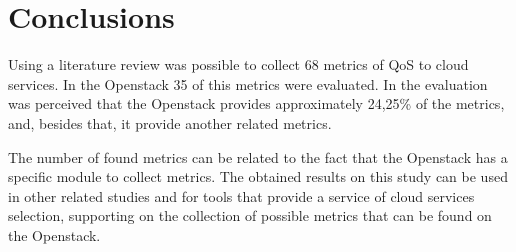 \documentclass[conference]{IEEEtran}
\begin{document}
\section{Conclusions}

Using a literature review was possible to collect 68 metrics of QoS to cloud services. In the Openstack 35 of this metrics were evaluated. 
In the evaluation was perceived that the Openstack provides approximately 24,25\% of the metrics, and, besides that, it provide
another related metrics. 


The number of found metrics can be related to the fact that the Openstack has a specific module to collect metrics. The obtained results on this study can be used in other related studies and for tools that provide a service of cloud services selection, supporting on the collection of possible metrics that can be found on the Openstack.


\end{document}
